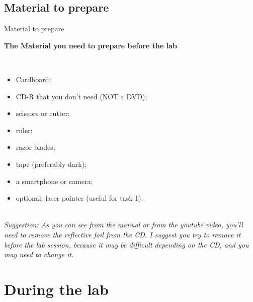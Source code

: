 \documentclass[9pt, xcolor=dvipsnames]{beamer}
\begin{document}
\subsection{Material to prepare}
\begin{frame}{Material to prepare}

\textbf{The Material you need to prepare before the lab}.

~\\

\begin{itemize}
\item Cardboard;
\item CD-R that you don’t need (NOT a DVD);
\item scissors or cutter;
\item ruler;
\item razor blades;
\item tape (preferably dark);
\item a smartphone or camera;
\item optional: laser pointer (useful for task 1).

\end{itemize}

~\\
\textit{Suggestion: As you can see from the manual or from the youtube video, you'll need to remove the reflective foil from the CD. I suggest you try to remove it before the lab session, because it may be difficult depending on the CD, and you may need to change it.}



\end{frame}

\section{During the lab}
\end{document}
